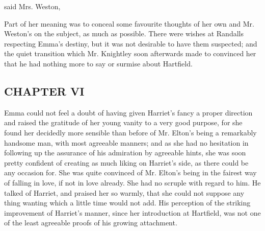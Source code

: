 
 said Mrs. Weston, 

Part of her meaning was to conceal some favourite thoughts of her own and Mr. Weston's on the subject, as much as possible. There were wishes at Randalls respecting Emma's destiny, but it was not desirable to have them suspected; and the quiet transition which Mr. Knightley soon afterwards made to  convinced her that he had nothing more to say or surmise about Hartfield.

\subsection[chapter-vi]{\useURL[url6][][][]\from[url6]CHAPTER VI}

Emma could not feel a doubt of having given Harriet's fancy a proper direction and raised the gratitude of her young vanity to a very good purpose, for she found her decidedly more sensible than before of Mr. Elton's being a remarkably handsome man, with most agreeable manners; and as she had no hesitation in following up the assurance of his admiration by agreeable hints, she was soon pretty confident of creating as much liking on Harriet's side, as there could be any occasion for. She was quite convinced of Mr. Elton's being in the fairest way of falling in love, if not in love already. She had no scruple with regard to him. He talked of Harriet, and praised her so warmly, that she could not suppose any thing wanting which a little time would not add. His perception of the striking improvement of Harriet's manner, since her introduction at Hartfield, was not one of the least agreeable proofs of his growing attachment.


